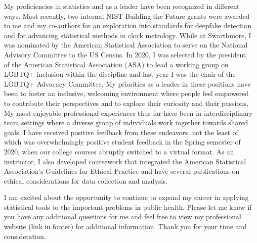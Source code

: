 \documentclass[11pt,a4paper,sans]{moderncv}
\begin{document}
	My proficiencies in statistics and as a leader have been recognized in different ways. Most recently, two internal NIST Building the Future grants were awarded to me and my co-authors for an exploration into standards for deepfake detection and for advancing statistical methods in clock metrology. While at Swarthmore, I was nominated by the American Statistical Association to serve on the National Advisory Committee to the US Census. In 2020, I was selected by the president of the American Statistical Association (ASA) to lead a working group on LGBTQ+ inclusion within the discipline and last year I was the chair of the LGBTQ+ Advocacy Committee. My priorities as a leader in these positions have been to foster an inclusive, welcoming environment where people feel empowered to contribute their perspectives and to explore their curiosity and their passions. My most enjoyable professional experiences thus far have been in interdisciplinary team settings where a diverse group of individuals work together towards shared goals. I have received positive feedback from these endeavors, not the least of which was overwhelmingly positive student feedback in the Spring semester of 2020, when our college courses abruptly switched to a virtual format. As an instructor, I also developed coursework that integrated the American Statistical Association's Guidelines for Ethical Practice and have several publications on ethical considerations for data collection and analysis.
		
	\vspace{2mm} 
	
	I am excited about the opportunity to continue to expand my career in applying statistical tools to the important problems in public health. Please let me know if you have any additional questions for me and feel free to view my professional website (link in footer) for additional information. Thank you for your time and consideration.\\
	
	\vspace{3mm}
	
	\makeletterclosing
	
\end{document}
